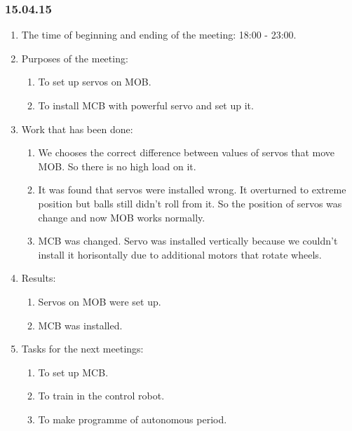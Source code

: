 \subsubsection{15.04.15}
\begin{enumerate}
	
	\item The time of beginning and ending of the meeting: 18:00 - 23:00.
	
	\item Purposes of the meeting: 
	\begin{enumerate}
		
		\item To set up servos on MOB.
		
		\item To install MCB with powerful servo and set up it.
		
	\end{enumerate}

	\item Work that has been done:
	\begin{enumerate}
		
		\item We chooses the correct difference between values of servos that move MOB. So there is no high load on it.
		
		\item It was found that servos were installed wrong. It overturned to extreme position but balls still didn't roll from it. So the position of servos was change and now MOB works normally.
		
        \item MCB was changed. Servo was installed vertically because we couldn't install it horisontally due to additional motors that rotate wheels.

	\end{enumerate}
	
	\item Results:
	\begin{enumerate}
		
		\item Servos on MOB were set up.
		
		\item MCB was installed.
		
	\end{enumerate}
	
	\item Tasks for the next meetings:
	\begin{enumerate}
		
		\item To set up MCB.
		
		\item To train in the control robot.
		
        \item To make programme of autonomous period.
			
	\end{enumerate}
\end{enumerate}
\fillpage
